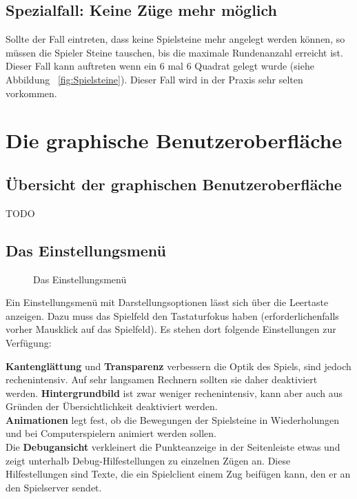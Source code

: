\documentclass[a4paper, ngerman]{scrartcl}
\begin{document}
\subsection{Spezialfall: Keine Züge mehr möglich}
Sollte der Fall eintreten, dass keine Spielsteine mehr angelegt werden können, so müssen die Spieler Steine tauschen, bis die maximale Rundenanzahl erreicht ist. Dieser Fall kann auftreten wenn ein 6 mal 6 Quadrat gelegt wurde (siehe Abbildung  ~\ref{fig:Spielsteine}). Dieser Fall wird in der Praxis sehr selten vorkommen.
	
\section{Die graphische Benutzeroberfläche}
\subsection{Übersicht der graphischen Benutzeroberfläche}
TODO
	
\subsection{Das Einstellungsmenü}
	 \begin{figure}[h]
		\centering
		\caption{Das Einstellungsmenü}
		\label{fig:Configuration}
	\end{figure}
	
	Ein Einstellungsmenü mit Darstellungsoptionen lässt
sich über die Leertaste anzeigen. Dazu muss das
Spielfeld den Tastaturfokus haben (erforderlichenfalls
vorher Mausklick auf das Spielfeld). Es stehen dort
folgende Einstellungen zur Verfügung:

\textbf{Kantenglättung} und \textbf{Transparenz} verbessern die Optik des
Spiels, sind jedoch rechenintensiv. Auf sehr langsamen Rechnern sollten sie daher
deaktiviert werden. \textbf{Hintergrundbild} ist zwar weniger rechenintensiv,
kann aber auch aus Gründen der Übersichtlichkeit deaktiviert werden.\\
\textbf{Animationen} legt fest, ob die Bewegungen der Spielsteine in
Wiederholungen und bei Computerspielern animiert werden sollen.\\
Die \textbf{Debugansicht} verkleinert die Punkteanzeige in der Seitenleiste
etwas und zeigt unterhalb Debug-Hilfestellungen zu einzelnen Zügen an. Diese
Hilfestellungen sind Texte, die ein Spielclient einem Zug beifügen kann, den er
an den Spielserver sendet.
	
\end{document}

